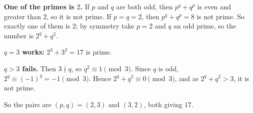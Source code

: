 \textbf{One of the primes is $2$.} If $p$ and $q$ are both odd, then $p^q+q^p$ is even and greater than $2$, so it is not prime. If $p=q=2$, then $p^q+q^p=8$ is not prime. So exactly one of them is $2$; by symmetry take $p=2$ and $q$ an odd prime, so the number is $2^q+q^2$.

\textbf{$q=3$ works:} $2^3+3^2=17$ is prime.

\textbf{$q>3$ fails.} Then $3\nmid q$, so $q^2\equiv1\pmod 3$. Since $q$ is odd, $2^q\equiv(-1)^q=-1\pmod 3$. Hence $2^q+q^2\equiv0\pmod3$, and as $2^q+q^2>3$, it is not prime.

So the pairs are $\boxed{(p,q)=(2,3)\text{ and }(3,2)}$, both giving $17$.
